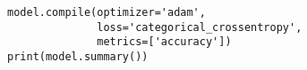 \begin{verbatim}
model.compile(optimizer='adam',
              loss='categorical_crossentropy',
              metrics=['accuracy'])
print(model.summary())
\end{verbatim}